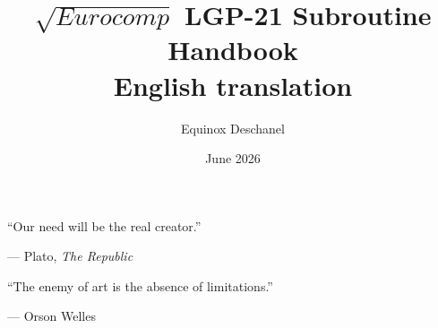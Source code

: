 \documentclass{article}
\title{$\sqrt{Eurocomp}$ LGP-21 Subroutine Handbook \\ \large English translation}
\author{Equinox Deschanel}
\date{June 2026}
\begin{document}
\maketitle

\begin{titlepage}
\clearpage\thispagestyle{empty}
\vspace*{\fill}

\epigraph{``Our need will be the real creator.''}{--- Plato, \textit{The Republic}}

\vspace{1.5em}

\epigraph{``The enemy of art is the absence of limitations.''}{--- Orson Welles}

\vspace*{\fill}
\clearpage
\end{titlepage}

\tableofcontents
\newpage
























\end{document}
